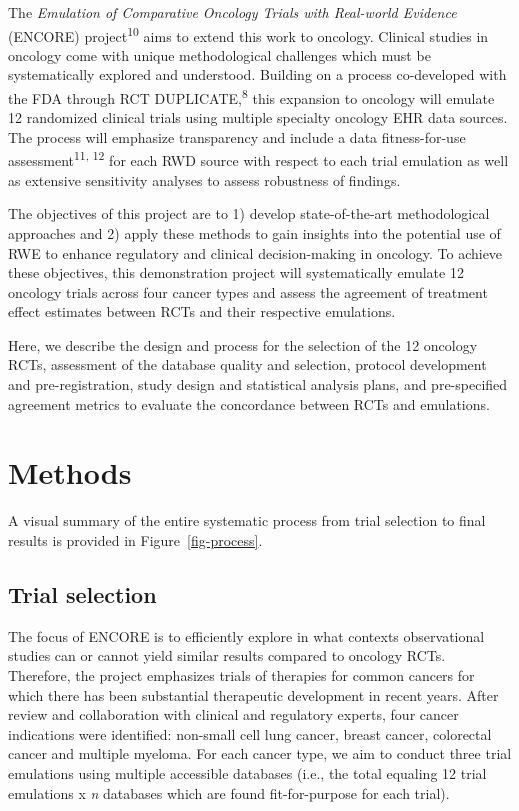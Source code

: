 \documentclass[
  letterpaper,
  DIV=11,
  numbers=noendperiod]{scrartcl}
\begin{document}
The \emph{Emulation of Comparative Oncology Trials with Real-world
Evidence} (ENCORE) project\textsuperscript{10} aims to extend this work
to oncology. Clinical studies in oncology come with unique
methodological challenges which must be systematically explored and
understood. Building on a process co-developed with the FDA through RCT
DUPLICATE,\textsuperscript{8} this expansion to oncology will emulate 12
randomized clinical trials using multiple specialty oncology EHR data
sources. The process will emphasize transparency and include a data
fitness-for-use assessment\textsuperscript{11, 12} for each RWD source
with respect to each trial emulation as well as extensive sensitivity
analyses to assess robustness of findings.

The objectives of this project are to 1) develop state-of-the-art
methodological approaches and 2) apply these methods to gain insights
into the potential use of RWE to enhance regulatory and clinical
decision-making in oncology. To achieve these objectives, this
demonstration project will systematically emulate 12 oncology trials
across four cancer types and assess the agreement of treatment effect
estimates between RCTs and their respective emulations.

Here, we describe the design and process for the selection of the 12
oncology RCTs, assessment of the database quality and selection,
protocol development and pre-registration, study design and statistical
analysis plans, and pre-specified agreement metrics to evaluate the
concordance between RCTs and emulations.

\section{Methods}\label{methods}

A visual summary of the entire systematic process from trial selection
to final results is provided in Figure~\ref{fig-process}.

\subsection{Trial selection}\label{trial-selection}

The focus of ENCORE is to efficiently explore in what contexts
observational studies can or cannot yield similar results compared to
oncology RCTs. Therefore, the project emphasizes trials of therapies for
common cancers for which there has been substantial therapeutic
development in recent years. After review and collaboration with
clinical and regulatory experts, four cancer indications were
identified: non-small cell lung cancer, breast cancer, colorectal cancer
and multiple myeloma. For each cancer type, we aim to conduct three
trial emulations using multiple accessible databases (i.e., the total
equaling 12 trial emulations x \emph{n} databases which are found
fit-for-purpose for each trial).
\end{document}

